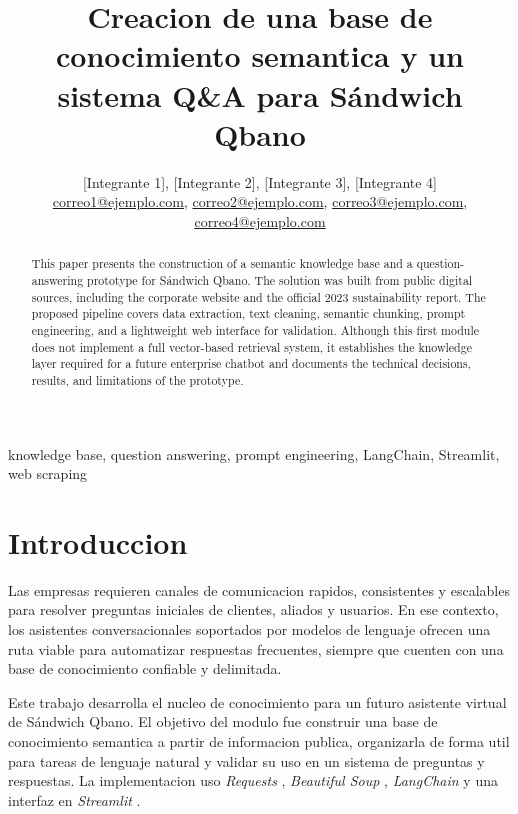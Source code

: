 \documentclass[journal]{IEEEtran}
\begin{document}
\title{Creacion de una base de conocimiento semantica y un sistema Q\&A para Sándwich Qbano}

\author{
[Integrante 1], [Integrante 2], [Integrante 3], [Integrante 4]\\
\href{mailto:correo1@ejemplo.com}{correo1@ejemplo.com},
\href{mailto:correo2@ejemplo.com}{correo2@ejemplo.com},
\href{mailto:correo3@ejemplo.com}{correo3@ejemplo.com},
\href{mailto:correo4@ejemplo.com}{correo4@ejemplo.com}
}

\maketitle

\begin{abstract}
This paper presents the construction of a semantic knowledge base and a question-answering prototype for Sándwich Qbano. The solution was built from public digital sources, including the corporate website and the official 2023 sustainability report. The proposed pipeline covers data extraction, text cleaning, semantic chunking, prompt engineering, and a lightweight web interface for validation. Although this first module does not implement a full vector-based retrieval system, it establishes the knowledge layer required for a future enterprise chatbot and documents the technical decisions, results, and limitations of the prototype.
\end{abstract}

\begin{IEEEkeywords}
knowledge base, question answering, prompt engineering, LangChain, Streamlit, web scraping
\end{IEEEkeywords}

\IEEEpeerreviewmaketitle

\section{Introduccion}
Las empresas requieren canales de comunicacion rapidos, consistentes y escalables para resolver preguntas iniciales de clientes, aliados y usuarios. En ese contexto, los asistentes conversacionales soportados por modelos de lenguaje ofrecen una ruta viable para automatizar respuestas frecuentes, siempre que cuenten con una base de conocimiento confiable y delimitada.

Este trabajo desarrolla el nucleo de conocimiento para un futuro asistente virtual de Sándwich Qbano. El objetivo del modulo fue construir una base de conocimiento semantica a partir de informacion publica, organizarla de forma util para tareas de lenguaje natural y validar su uso en un sistema de preguntas y respuestas. La implementacion uso \textit{Requests} \cite{requests_docs}, \textit{Beautiful Soup} \cite{beautifulsoup_docs}, \textit{LangChain} \cite{langchain_docs} y una interfaz en \textit{Streamlit} \cite{streamlit_docs}.
\end{document}
